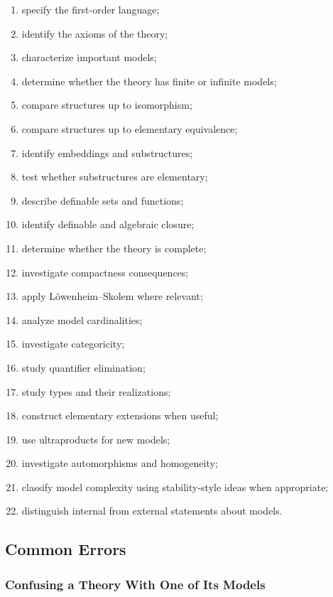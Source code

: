 \begin{enumerate}
    \item specify the first-order language;
    \item identify the axioms of the theory;
    \item characterize important models;
    \item determine whether the theory has finite or infinite models;
    \item compare structures up to isomorphism;
    \item compare structures up to elementary equivalence;
    \item identify embeddings and substructures;
    \item test whether substructures are elementary;
    \item describe definable sets and functions;
    \item identify definable and algebraic closure;
    \item determine whether the theory is complete;
    \item investigate compactness consequences;
    \item apply Löwenheim--Skolem where relevant;
    \item analyze model cardinalities;
    \item investigate categoricity;
    \item study quantifier elimination;
    \item study types and their realizations;
    \item construct elementary extensions when useful;
    \item use ultraproducts for new models;
    \item investigate automorphisms and homogeneity;
    \item classify model complexity using stability-style ideas when
          appropriate;
    \item distinguish internal from external statements about models.
\end{enumerate}

\subsection{Common Errors}
\label{subsec:model-theory-common-errors}

\subsubsection{Confusing a Theory With One of Its Models}

